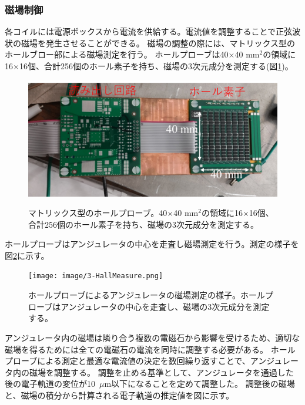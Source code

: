 \documentclass[a4paper,11pt,uplatex]{jsbook}
\begin{document}
\subsubsection{磁場制御}
各コイルには電源ボックスから電流を供給する。電流値を調整することで正弦波状の磁場を発生させることができる。
磁場の調整の際には、マトリックス型のホールブロー部による磁場測定を行う。
ホールプローブは40$\times$40 mm$^2$の領域に16$\times$16個、合計256個のホール素子を持ち、磁場の3次元成分を測定する(図\ref{hall})。
\begin{figure}
  \centering
  \includegraphics[width=0.8\linewidth]{image/3-hallmatrix.png}\\
  \caption[ホールプローブ]{マトリックス型のホールプローブ。40$\times$40 mm$^2$の領域に16$\times$16個、合計256個のホール素子を持ち、磁場の3次元成分を測定する。}
  \label{hall}
\end{figure}
ホールプローブはアンジュレータの中心を走査し磁場測定を行う。測定の様子を図\ref{hallscan}に示す。
\begin{figure}
  \centering
  \texttt{[image: image/3-HallMeasure.png]}\\
  \caption[ホールプローブの走査]{ホールプローブによるアンジュレータの磁場測定の様子。ホールプローブはアンジュレータの中心を走査し、磁場の3次元成分を測定する。}
  \label{hallscan}
\end{figure}
アンジュレータ内の磁場は隣り合う複数の電磁石から影響を受けるため、適切な磁場を得るためには全ての電磁石の電流を同時に調整する必要がある。
ホールプローブによる測定と最適な電流値の決定を数回繰り返すことで、アンジュレータ内の磁場を調整する。
調整を止める基準として、アンジュレータを通過した後の電子軌道の変位が10~$\mu$m以下になることを定めて調整した。
調整後の磁場と、磁場の積分から計算される電子軌道の推定値を図に示す。
\end{document}
